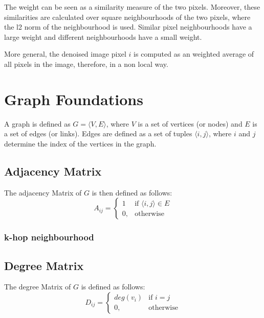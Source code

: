 The weight can be seen as a similarity measure of the two pixels.
Moreover, these similarities are calculated over square neighbourhoods of the two pixels,
where the l2 norm of the neighbourhood is used.
Similar pixel neighbourhoods have a large weight and different neighbourhoods have a small weight.

More general, the denoised image pixel $i$ is computed as an weighted average of all pixels in the 
image, therefore, in a non local way.

\section{Graph Foundations}
A graph is defined as  $G = \langle V,E \rangle$, where $V$ is a set of 
vertices (or nodes) and $E$ is a set of edges (or links). Edges are 
defined as a set of tuples $\langle i,j \rangle$, where $i$ and $j$ determine the 
index of the vertices in the graph.

\subsection{Adjacency Matrix}

The adjacency Matrix of $G$ is then defined as follows:
\begin{equation}
    A_{ij} =    
    \begin{cases}
        1  & \text{if } \langle i , j \rangle \in E \\
        0, & \text{otherwise}
    \end{cases}
\end{equation}

\subsubsection{k-hop neighbourhood}

\subsection{Degree Matrix}

The degree Matrix of $G$ is defined as follows:
\begin{equation}
    D_{ij} =    
    \begin{cases}
        deg(v_i)  & \text{if } i = j \\
        0, & \text{otherwise}
    \end{cases}
\end{equation}

